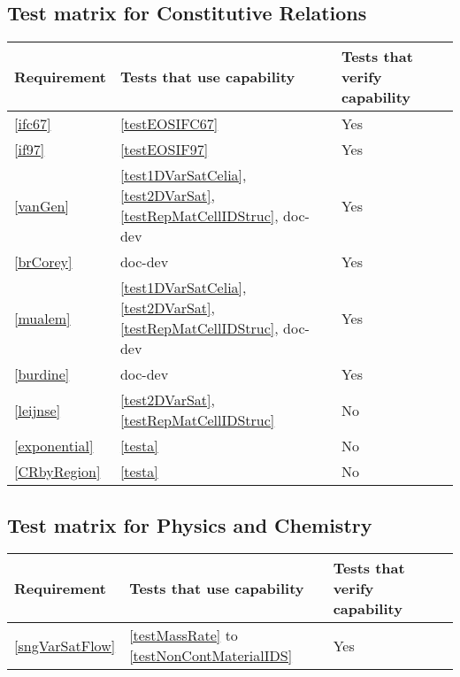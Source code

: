 \subsection{Test matrix for Constitutive Relations}
\begin{tabular}{|l|l|l|l|}
	\hline
	Requirement & Tests that use capability & Tests that verify capability \\
	\hline
	\hline
	\ref{ifc67} & \ref{testEOSIFC67} & Yes\\
	\hline
	\ref{if97} & \ref{testEOSIF97} & Yes \\
	\hline
		\ref{vanGen} & \ref{test1DVarSatCelia}, \ref{test2DVarSat}, \ref{testRepMatCellIDStruc}, doc-dev & Yes\\
	\hline
		\ref{brCorey} & doc-dev & Yes\\
	\hline
		\ref{mualem} & \ref{test1DVarSatCelia}, \ref{test2DVarSat},  \ref{testRepMatCellIDStruc}, doc-dev & Yes\\
	\hline
		\ref{burdine} & doc-dev & Yes\\
	\hline
		\ref{leijnse} &  \ref{test2DVarSat},  \ref{testRepMatCellIDStruc} & No \\
	\hline
		\ref{exponential} & \ref{testa} & No \\
	\hline
		\ref{CRbyRegion} & \ref{testa} & No \\
	\hline
\end{tabular}

\subsection{Test matrix for Physics and Chemistry}
\begin{tabular}{|l|l|l|l|}
	\hline
		Requirement & Tests that use capability & Tests that verify capability \\
	\hline
	\hline
		\ref{sngVarSatFlow} &  \ref{testMassRate} to \ref{testNonContMaterialIDS} & Yes \\
	\hline
\end{tabular}

